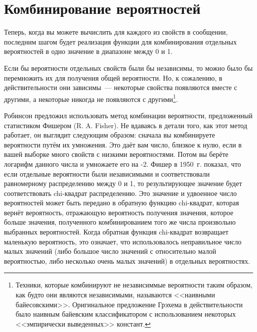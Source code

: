 \section{Комбинирование вероятностей}

Теперь, когда вы можете вычислить  для каждого из свойств
в сообщении, последним шагом будет реализация функции  для комбинирования
отдельных вероятностей в одно значение в диапазоне между 0 и 1.

Если бы вероятности отдельных свойств были бы независимы, то можно было бы перемножить их
для получения общей вероятности.  Но, к сожалению, в действительности они зависимы~---
некоторые свойства появляются вместе с другими, а некоторые никогда не появляются с
другими\footnote{Техники, которые комбинируют не независиммые вероятности таким образом,
  как будто они являются независимыми, называются <<наивными байесовскими>>.  Оригинальное
  предложение Грэхема в действительности было наивным байевским классификатором с
  использованием некоторых <<эмпирически выведенных>> констант.}.

Робинсон предложил использовать метод комбинации вероятности, предложенный статистиком
Фишером (R. A. Fisher).  Не вдаваясь в детали того, как этот метод работает, он выглядит
следующим образом: сначала вы комбинируете вероятности путём их умножения.  Это даёт вам
число, близкое к нулю, если в вашей выборке много свойств с низкими вероятностями.  Потом
вы берёте логарифм данного числа и умножаете его на -2.  Фишер в 1950~г. показал, что если
отдельные вероятности были независимыми и соответствовали равномерному распределению
между 0 и 1, то результирующее значение будет соответствовать chi-квадрат
распределению. Это значение и удвоенное число вероятностей может быть передано в обратную
функцию chi-квадрат, которая вернёт вероятность, отражающую вероятность получения
значения, которое больше значения, полученного комбинированием того же числа произвольно
выбранных вероятностей.  Когда обратная функция chi-квадрат возвращает маленькую
вероятность, это означает, что использовалось неправильное число малых значений (либо
большое число значений с относительно малой вероятностью, либо несколько очень малых
значений) в отдельных вероятностях.

